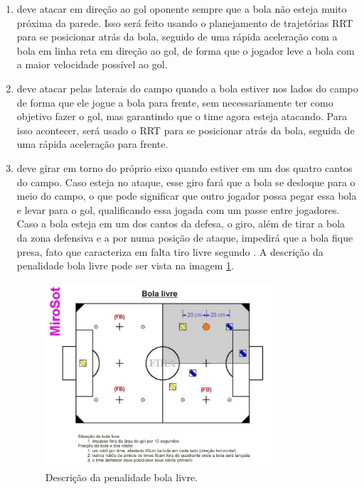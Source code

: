 \documentclass[a4paper,12pt]{article}
\begin{document}
\begin{enumerate}
\item deve atacar em direção ao gol oponente sempre que a bola não esteja muito próxima da parede. Isso será feito usando o planejamento de trajetórias RRT para se posicionar atrás da bola, seguido de uma rápida aceleração com a bola em linha reta em direção ao gol, de forma que o jogador leve a bola com a maior velocidade possível ao gol.
\item deve atacar pelas laterais do campo quando a bola estiver nos lados do campo de forma que ele jogue a bola para frente, sem necessariamente ter como objetivo fazer o gol, mas garantindo que o time agora esteja atacando. Para isso acontecer, será usado o RRT para se posicionar atrás da bola, seguida de uma rápida aceleração para frente.
\item deve girar em torno do próprio eixo quando estiver em um dos quatro cantos do campo. Caso esteja no ataque, esse giro fará que a bola se desloque para o meio do campo, o que pode significar que outro jogador possa pegar essa bola e levar para o gol, qualificando essa jogada com um passe entre jogadores. Caso a bola esteja em um dos cantos da defesa, o giro, além de tirar a bola da zona defensiva e a por numa posição de ataque, impedirá que a bola fique presa, fato que caracteriza em falta tiro livre segundo \cite{cbr2008}. A descrição da penalidade bola livre pode ser vista na imagem \ref{fig:bola_livre}.


\begin{figure}[H]
	\centering
	\includegraphics[width=0.8\textwidth]{figures/bola_livre.png}
   \caption{Descrição da penalidade bola livre.} \label{fig:bola_livre}
\end{figure}


\end{enumerate}
\end{document}
